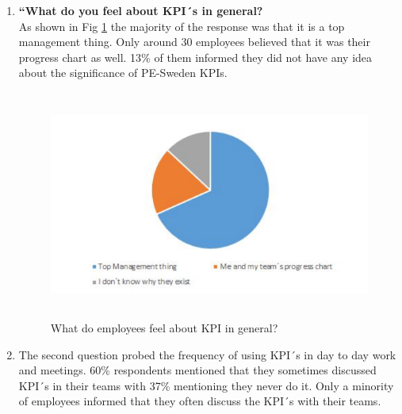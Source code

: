 \begin{enumerate}
    \item \textbf{“What do you feel about KPI´s in general?}\\
     As shown in Fig \ref{fig:5.6} the majority of the response was that it is a top management thing. Only around 30 employees believed that it was their progress chart as well. 13\% of them informed they did not have any idea about the significance of PE-Sweden KPIs.
    \begin{figure}[H]
    \centering
    \captionsetup{justification=centering, margin=2cm}
    \vspace{1cm}
    \includegraphics[width=12cm, height=7.5cm]{figure/auxiliary/fig56.PNG}
    \caption{What do employees feel about KPI in general?}
    \label{fig:5.6}
\end{figure}
    \item The second question probed the frequency of using KPI´s in day to day work and meetings. 60\% respondents mentioned that they sometimes discussed KPI´s in their teams with 37\% mentioning they never do it. Only a minority of employees informed that they often discuss the KPI´s with their teams.
    

\end{enumerate}
